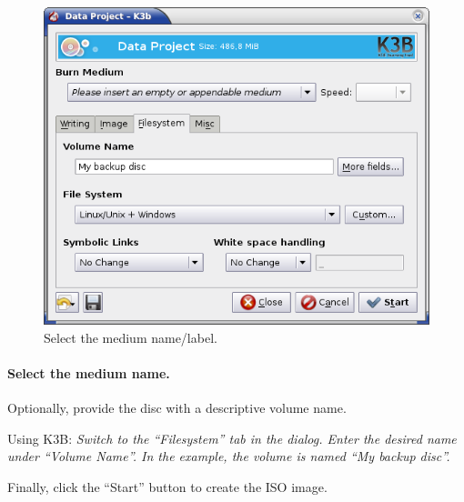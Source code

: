 \newpage
\begin{figure}[h]
\centerline{\includegraphics[width=\textwidth]{screenshots/make-iso5.png}}
\caption{Select the medium name/label.}  
\label{howto-augment-make-iso-label}
\end{figure}

\paragraph{Select the medium name.} Optionally, provide the disc
with a descriptive volume name.

\bigskip

Using K3B: {\em Switch to the ``Filesystem'' tab in the dialog.
  Enter the desired name under ``Volume Name''. In the example, the volume
  is named ``My backup disc''.}

\bigskip

Finally, click the ``Start'' button to create the ISO image. 

